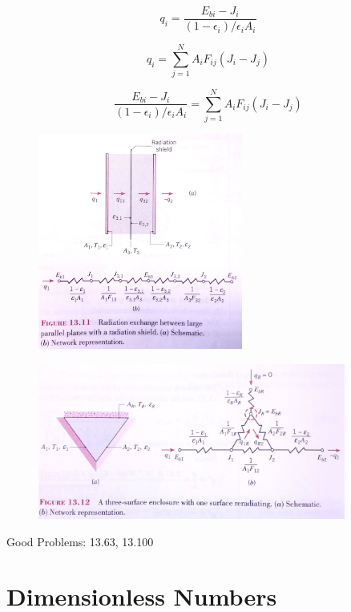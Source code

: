 \documentclass[paper=letter, fontsize=11pt]{scrartcl}
\numberwithin{equation}{section}        %
\numberwithin{figure}{section}          %
\numberwithin{table}{section}               %
\begin{document}
\begin{equation}
q_i = \frac{E_{bi}-J_i}{(1-\epsilon_i)/\epsilon_iA_i}
\end{equation}

\begin{equation}
q_i = \sum_{j=1}^N A_i F_{ij} (J_i-J_j)
\end{equation}

\begin{equation}
\frac{E_{bi}-J_i}{(1-\epsilon_i)/\epsilon_iA_i} = \sum_{j=1}^N A_i F_{ij} (J_i-J_j)
\end{equation}

\begin{figure}[!ht]
\centering
\includegraphics[width=0.6\textwidth]{./Figures/radiation_shield}
\end{figure}

\begin{figure}[!ht]
\centering
\includegraphics[width=0.9\textwidth]{./Figures/three_surface}
\end{figure}

\bigskip Good Problems: 13.63, 13.100

\clearpage
\section{Dimensionless Numbers}
\end{document}
